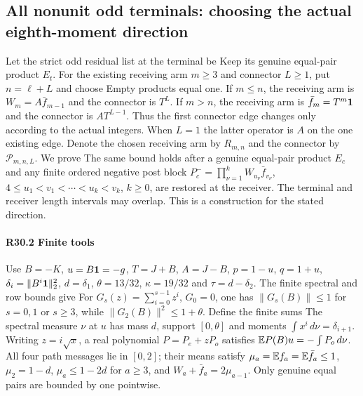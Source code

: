 \subsection{All nonunit odd terminals: choosing the actual eighth-moment direction}\label{proof:R2-C030}
Let the strict odd residual list at the terminal be
Keep its genuine equal-pair product $E_t$. For the existing receiving
arm $m\ge3$ and connector $L\ge1$, put $n=\ell+L$ and choose
Empty products equal one. If $m\le n$, the receiving arm is
$W_m=A\bar f_{m-1}$ and the connector is $T^L$.
If $m>n$, the receiving arm is $\bar f_m=T^m\mathbf1$ and the connector is
$AT^{L-1}$. Thus the first connector edge changes only according to
the actual integers. When $L=1$ the latter operator is $A$ on the
one existing edge. Denote the chosen receiving arm by $R_{m,n}$ and
the connector by $\mathcal P_{m,n,L}$. We prove
The same bound holds after a genuine equal-pair product $E_c$ and
any finite ordered negative post block
$P_c^-=\prod_{\nu=1}^kW_{u_\nu}\bar f_{v_\nu}$,
$4\le u_1<v_1<\cdots<u_k<v_k$, $k\ge0$, are restored at the receiver.
The terminal and receiver length intervals may overlap. This is a
construction for the stated direction.

\paragraph{R30.2 Finite tools}
Use $B=-K$, $u=B\mathbf1=-g$, $T=J+B$, $A=J-B$, $p=1-u$,
$q=1+u$, $\delta_i=\|B^i\mathbf1\|_2^2$, $d=\delta_1$,
$\theta=13/32$, $\kappa=19/32$ and $\tau=d-\delta_2$.
The finite spectral and row bounds give
For $G_s(z)=\sum_{i=0}^{s-1}z^i$, $G_0=0$, one has
$\|G_s(B)\|\le1$ for $s=0,1$ or $s\ge3$, while
$\|G_2(B)\|^2\le1+\theta$. Define the finite sums
The spectral measure $\nu$ at $u$ has mass $d$, support
$[0,\theta]$ and moments $\int x^i\,d\nu=\delta_{i+1}$.
Writing $z=i\sqrt x$, a real polynomial $P=P_e+zP_o$ satisfies
$\mathbb E P(B)u=-\int P_o\,d\nu$. All four path messages lie in $[0,2]$;
their means satisfy $\mu_a=\mathbb E f_a=\mathbb E\bar f_a\le1$,
$\mu_2=1-d$, $\mu_a\le1-2d$ for $a\ge3$, and
$W_a+\bar f_a=2\mu_{a-1}$. Only genuine equal pairs are bounded by
one pointwise.

